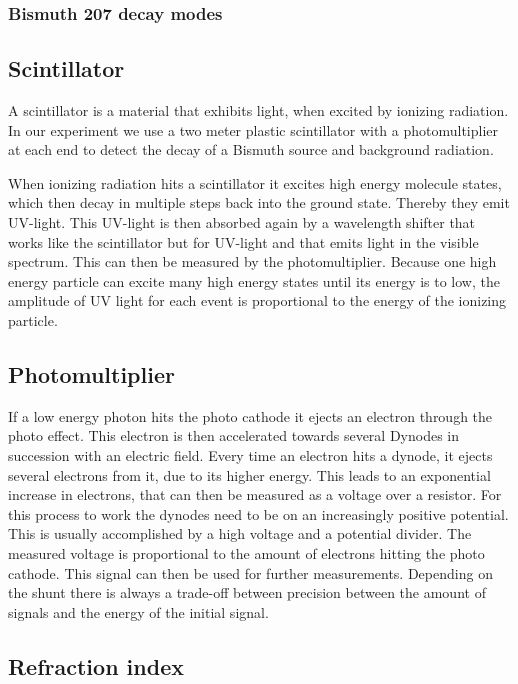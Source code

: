 \documentclass[]{article}
\begin{document}
\subsubsection{Bismuth 207 decay modes}


\subsection{Scintillator}\label{scintillator}
A scintillator is a material that exhibits light, when excited by ionizing radiation. In our experiment we use a two meter plastic scintillator with a photomultiplier at each end to detect the decay of a Bismuth source and background radiation.

When ionizing radiation hits a scintillator it excites high energy molecule states, which then decay in multiple steps back into the ground state. Thereby they emit UV-light. This UV-light is then absorbed again by a wavelength shifter that works like the scintillator but for UV-light and that emits light in the visible spectrum. This can then be measured by the photomultiplier. Because one high energy particle can excite many high energy states until its energy is to low, the amplitude of UV light for each event is proportional to the energy of the ionizing particle.
\subsection{Photomultiplier}
If a low energy photon hits the photo cathode it ejects an electron through the photo effect. This electron is then accelerated towards several Dynodes in succession with an electric field. Every time an electron hits a dynode, it ejects several electrons from it, due to its higher energy. This leads to an exponential increase in electrons, that can then be measured as a voltage over a resistor. For this process to work the dynodes need to be on an increasingly positive potential. This is usually accomplished by a high voltage and a potential divider. 
The measured voltage is proportional to the amount of electrons hitting the photo cathode. This signal can then be used for further measurements. Depending on the shunt there is always a trade-off between precision between the amount of signals and the energy of the initial signal. 
\subsection{Refraction index}\label{refrac index}
\end{document}
